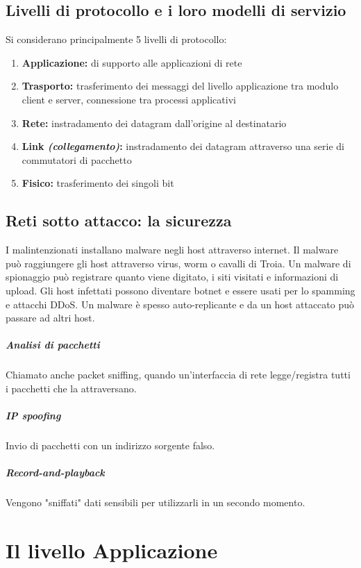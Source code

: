 \documentclass{report}
\begin{document}
	\section{Livelli di protocollo e i loro modelli di servizio}
	Si considerano principalmente 5 livelli di protocollo:
	\begin{enumerate}
		\item \textbf{Applicazione:} di supporto alle applicazioni di rete
		\item \textbf{Trasporto:} trasferimento dei messaggi del livello applicazione tra modulo client e server, connessione tra processi applicativi
		\item \textbf{Rete:} instradamento dei datagram dall'origine al destinatario
		\item \textbf{Link \textit{(collegamento)}:} instradamento dei datagram attraverso una serie di commutatori di pacchetto
		\item \textbf{Fisico:} trasferimento dei singoli bit
	\end{enumerate}
	\section{Reti sotto attacco: la sicurezza}
	I malintenzionati installano malware negli host attraverso internet. Il malware può raggiungere gli host attraverso virus, worm o cavalli di Troia. Un malware di spionaggio può registrare quanto viene digitato, i siti visitati e informazioni di upload. Gli host infettati possono diventare botnet e essere usati per lo spamming e attacchi DDoS. Un malware è spesso auto-replicante e da un host attaccato può passare ad altri host.
	\paragraph{Analisi di pacchetti} Chiamato anche packet sniffing, quando un'interfaccia di rete legge/registra tutti i pacchetti che la attraversano.
	\paragraph{IP spoofing} Invio di pacchetti con un indirizzo sorgente falso.
	\paragraph{Record-and-playback} Vengono "sniffati" dati sensibili per utilizzarli in un secondo momento.
	\chapter{Il livello Applicazione}
\end{document}
